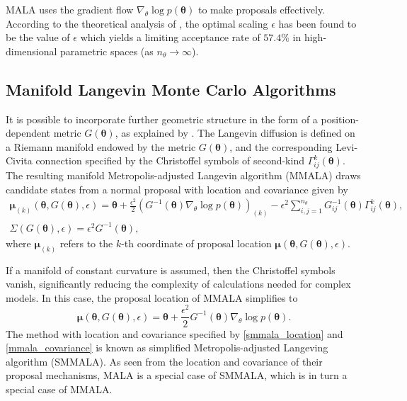 \documentclass[twoside,11pt]{article}
\begin{document}
MALA uses the gradient flow $\nabla_{\theta}\log{p(\boldsymbol{\theta})}$ to make proposals effectively.
According to the theoretical analysis of \cite{rob_ros__opt}, the optimal scaling $\epsilon$ has been found to be the value 
of $\epsilon$ which yields a limiting acceptance rate of $57.4\%$ in high-dimensional parametric spaces 
(as $n_{\theta}\rightarrow\infty$).

\subsection{Manifold Langevin Monte Carlo Algorithms}
\label{smmala_section}

It is possible to incorporate further geometric structure in the form of a 
position-dependent metric $G(\boldsymbol{\theta})$, as explained by \cite{gir_cal__rie}.
The Langevin diffusion is defined on a Riemann manifold endowed by the metric $G(\boldsymbol{\theta})$, and the
corresponding Levi-Civita connection specified by the Christoffel symbols of second-kind 
$\Gamma^{k}_{ij}(\boldsymbol{\theta})$. The resulting manifold Metropolis-adjusted Langevin algorithm (MMALA) draws 
candidate states from a normal proposal with location and covariance given by
\begin{eqnarray}
\label{mmala_location}
\boldsymbol{\mu}_{(k)}(\boldsymbol{\theta}, G(\boldsymbol{\theta}), \epsilon) =
\boldsymbol{\theta}+
\frac{\epsilon^2}{2}(G^{-1}(\boldsymbol{\theta})\nabla_{\theta}\log{p(\boldsymbol{\theta})})_{(k)}-
\epsilon^2\sum_{i,j=1}^{n_\theta}G^{-1}_{ij}(\boldsymbol{\theta})\Gamma^{k}_{ij}(\boldsymbol{\theta}),\\
\label{mmala_covariance}
\Sigma(G(\boldsymbol{\theta}), \epsilon) = \epsilon^2 G^{-1}(\boldsymbol{\theta}),
\end{eqnarray}
where $\boldsymbol{\mu}_{(k)}$ refers to the $k$-th coordinate of proposal location
$\boldsymbol{\mu}(\boldsymbol{\theta}, G(\boldsymbol{\theta}), \epsilon)$.

If a manifold of constant curvature is assumed, then the Christoffel symbols vanish, significantly reducing the complexity 
of calculations needed for complex models. In this case, the proposal location of MMALA simplifies to
\begin{equation}
\label{smmala_location}
\boldsymbol{\mu}(\boldsymbol{\theta}, G(\boldsymbol{\theta}), \epsilon) =
\boldsymbol{\theta}+
\frac{\epsilon^2}{2}G^{-1}(\boldsymbol{\theta})\nabla_{\theta}\log{p(\boldsymbol{\theta})}.
\end{equation}
The method with location and covariance specified by \eqref{smmala_location} and \eqref{mmala_covariance} is known as 
simplified Metropolis-adjusted Langeving algorithm (SMMALA). As seen from the location and covariance of their proposal 
mechanisms, MALA is a special case of SMMALA, which is in turn a special case of MMALA.
\end{document}
